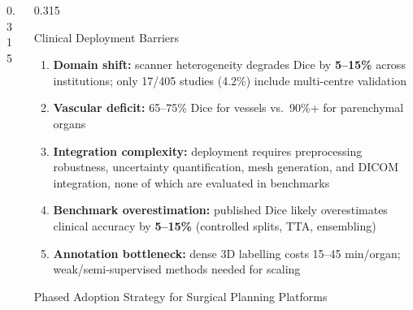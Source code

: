 \documentclass[final,t]{beamer}
\begin{document}
\begin{frame}[t]
\begin{columns}[t,totalwidth=\textwidth]
\begin{column}{0.315\textwidth}
\end{column}
\hfill

\begin{column}{0.315\textwidth}

\begin{pblock}{Clinical Deployment Barriers}
\begin{enumerate}\setlength\itemsep{2pt}
  \item \textbf{Domain shift:} scanner heterogeneity degrades Dice by
        \textbf{5--15\%} across institutions; only 17/405 studies (4.2\%)
        include multi-centre validation
  \item \textbf{Vascular deficit:} 65--75\% Dice for vessels vs.\
        90\%+ for parenchymal organs
  \item \textbf{Integration complexity:} deployment requires preprocessing
        robustness, uncertainty quantification, mesh generation, and DICOM
        integration, none of which are evaluated in benchmarks
  \item \textbf{Benchmark overestimation:} published Dice likely
        overestimates clinical accuracy by \textbf{5--15\%} (controlled splits,
        TTA, ensembling)
  \item \textbf{Annotation bottleneck:} dense 3D labelling costs
        15--45 min/organ; weak/semi-supervised methods needed for scaling
\end{enumerate}
\end{pblock}

\begin{pblock}{Phased Adoption Strategy for \newline Surgical Planning Platforms}


\end{pblock}
\end{column}
\end{columns}
\end{frame}
\end{document}
